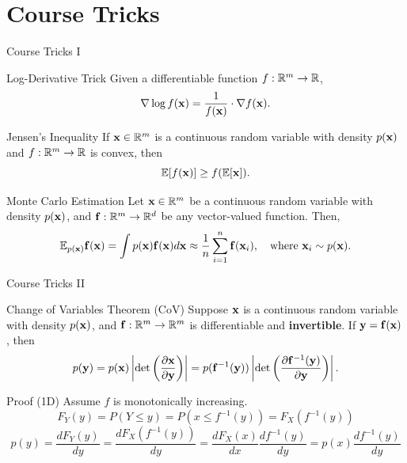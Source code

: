 \documentclass{beamer}
\begin{document}
\section{Course Tricks}
\begin{frame}{Course Tricks I}
	\begin{block}{Log-Derivative Trick}
		Given a differentiable function $f: \mathbb{R}^m \to \mathbb{R}$,
		$$
			\nabla \log f(\mathbf{x}) = \frac{1}{f(\mathbf{x})} \cdot \nabla f(\mathbf{x}).
		$$
		\vspace{-0.5cm}
	\end{block}
    \eqpause
	\begin{block}{Jensen's Inequality}
		If $\mathbf{x} \in \mathbb{R}^m$ is a continuous random variable with density $p(\mathbf{x})$ and $f: \mathbb{R}^m \to \mathbb{R}$ is convex, then
		$$
			\mathbb{E}[f(\mathbf{x})] \geq f(\mathbb{E}[\mathbf{x}]).
		$$
		\vspace{-0.7cm}
	\end{block}
    \eqpause
	\begin{block}{Monte Carlo Estimation}
		Let $\mathbf{x} \in \mathbb{R}^m$ be a continuous random variable with density $p(\mathbf{x})$, and $\mathbf{f}: \mathbb{R}^m \to \mathbb{R}^d$ be any vector-valued function. Then,
		$$
			\mathbb{E}_{p(\mathbf{x})} \mathbf{f}(\mathbf{x}) = \int p(\mathbf{x}) \mathbf{f}(\mathbf{x}) d \mathbf{x} \approx \frac{1}{n} \sum_{i=1}^n \mathbf{f}(\mathbf{x}_i), \quad 
			\text{where } \mathbf{x}_i \sim p(\mathbf{x}).
		$$
		\vspace{-0.4cm}
	\end{block}
\end{frame}
\begin{frame}{Course Tricks II}
	\begin{block}{Change of Variables Theorem (CoV)}
		Suppose $\mathbf{x}$ is a continuous random variable with density $p(\mathbf{x})$, and $\mathbf{f}: \mathbb{R}^m \to \mathbb{R}^m$ is differentiable and \textbf{invertible}. If $\mathbf{y} = \mathbf{f}(\mathbf{x})$, then
		\[
			p(\mathbf{y}) = p(\mathbf{x}) \left|\det \left(  \frac{\partial \mathbf{x}}{\partial \mathbf{y}} \right) \right| = p(\mathbf{f}^{-1}(\mathbf{y})) \left|\det \left(  \frac{\partial \mathbf{f}^{-1}(\mathbf{y})}{\partial \mathbf{y}} \right) \right|.
		\]
		\vspace{-0.5cm}
	\end{block}
    \eqpause
	\begin{block}{Proof (1D)}
		Assume $f$ is monotonically increasing.
		\[
			F_Y(y) = P(Y \leq y) = P(x \leq f^{-1}(y)) = F_X(f^{-1}(y))
		\]
        \eqpause
		$$
			p(y) = \frac{dF_Y(y)}{dy} = \frac{dF_X(f^{-1}(y))}{dy} = \frac{dF_X(x)}{dx} \frac{df^{-1}(y)}{dy} =  p(x) \frac{df^{-1}(y)}{dy}
		$$
	\end{block}
\end{frame}
\end{document}
